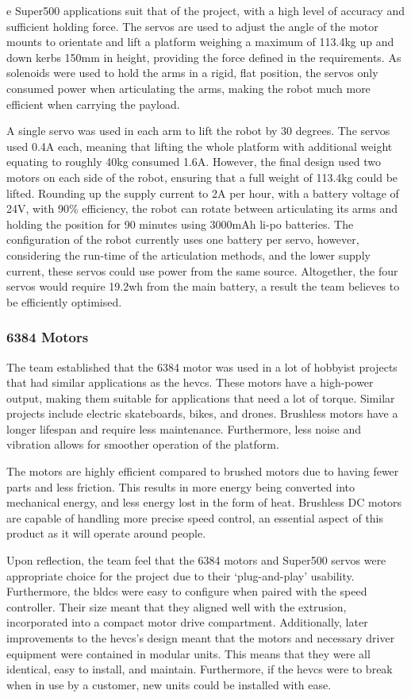 \documentclass [12pt]{article}
\begin{document}
e Super500 applications suit that of the project, with a high level of accuracy and sufficient holding force. The servos are used to adjust the angle of the motor mounts to orientate and lift a platform weighing a maximum of 113.4kg up and down kerbs 150mm in height, providing the force defined in the requirements. As solenoids were used to hold the arms in a rigid, flat position, the servos only consumed power when articulating the arms, making the robot much more efficient when carrying the payload.

A single servo was used in each arm to lift the robot by 30 degrees. The servos used 0.4A each, meaning that lifting the whole platform with additional weight equating to roughly 40kg consumed 1.6A. However, the final design used two motors on each side of the robot, ensuring that a full weight of 113.4kg could be lifted.  Rounding up the supply current to 2A per hour, with a battery voltage of 24V, with 90\% efficiency, the robot can rotate between articulating its arms and holding the position for 90 minutes using 3000mAh li-po batteries. The configuration of the robot currently uses one battery per servo, however, considering the run-time of the articulation methods, and the lower supply current, these servos could use power from the same source. Altogether, the four servos would require 19.2wh from the main battery, a result the team believes to be efficiently optimised.

\subsubsection{6384 Motors}

The team established that the 6384 motor was used in a lot of hobbyist projects that had similar applications as the \gls{hevcs}. These motors have a high-power output, making them suitable for applications that need a lot of torque. Similar projects include electric skateboards, bikes, and drones. Brushless motors have a longer lifespan and require less maintenance. Furthermore, less noise and vibration allows for smoother operation of the platform.

The motors are highly efficient compared to brushed motors due to having fewer parts and less friction. This results in more energy being converted into mechanical energy, and less energy lost in the form of heat. Brushless DC motors are capable of handling more precise speed control, an essential aspect of this product as it will operate around people.

Upon reflection, the team feel that the 6384 motors and Super500 servos were appropriate choice for the project due to their ‘plug-and-play’ usability. Furthermore, the \gls{bldc}s were easy to configure when paired with the speed controller. Their size meant that they aligned well with the extrusion, incorporated into a compact motor drive compartment. Additionally, later improvements to the \gls{hevcs}'s design meant that the motors and necessary driver equipment were contained in modular units. This means that they were all identical, easy to install, and maintain. Furthermore, if the \gls{hevcs} were to break when in use by a customer, new units could be installed with ease.
\end{document}
